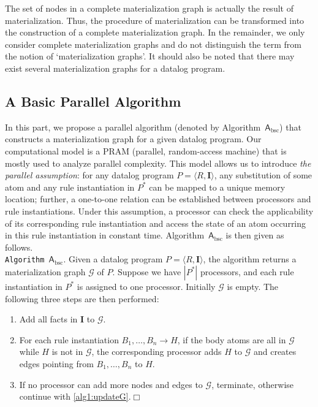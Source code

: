 The set of nodes in a complete materialization graph is actually the result
of materialization.
Thus, the procedure of materialization can be transformed into the construction of
a complete materialization graph.
In the remainder, we only consider complete materialization graphs and
do not distinguish the term from the
notion of `materialization graphs'.
It should also be noted that there may exist several materialization graphs for a datalog program.


\subsection{A Basic Parallel Algorithm}
\label{sec:alg-bsc}

In this part, we propose a parallel algorithm
(denoted by Algorithm~$\mathsf{A}_{\text{bsc}}$) that constructs a materialization graph for a given datalog program.
Our computational model is a PRAM (parallel, random-access machine) that is mostly used to analyze parallel
complexity. This model allows us to introduce \emph{the parallel assumption}:
for any datalog program $P=\langle R, \textbf{I}\rangle$,
any substitution of some atom and any rule instantiation in $P^*$ can be mapped to a unique memory
location; further, a one-to-one relation can be established between processors and rule instantiations.
Under this assumption, a processor can check the applicability of its corresponding
rule instantiation and access the state of an atom occurring in this rule instantiation in constant time.
Algorithm~$\mathsf{A}_{\text{bsc}}$ is then given as follows.\\


\noindent\texttt{Algorithm~$\mathsf{A}_{\text{bsc}}$}. Given a datalog program $P=\langle R, \textbf{I}\rangle$,
the algorithm returns a materialization graph $\mathcal{G}$ of $P$.
Suppose we have $|P^*|$ processors, and each rule instantiation in $P^*$ is
assigned to one processor.
Initially $\mathcal{G}$ is empty. The following three steps are then performed:
\begin{enumerate}[leftmargin=8ex,label=(\textit{Step \arabic*}),ref=Step~\arabic*]
\item Add all facts in $\textbf{I}$ to $\mathcal{G}$.\label{alg1:addFacts}
\item For each rule instantiation $B_1,\ldots,B_n\rightarrow H$, if the body atoms are all
    in $\mathcal{G}$ while $H$ is not in $\mathcal{G}$,
    the corresponding processor adds $H$ to $\mathcal{G}$ and creates edges pointing
    from $B_1,\ldots,B_n$ to $H$.\label{alg1:updateG}
\item If no processor can add more nodes and edges to $\mathcal{G}$,
  terminate, otherwise continue with \ref{alg1:updateG}.\label{alg1:halt}\hfill$\Box$
\end{enumerate}

